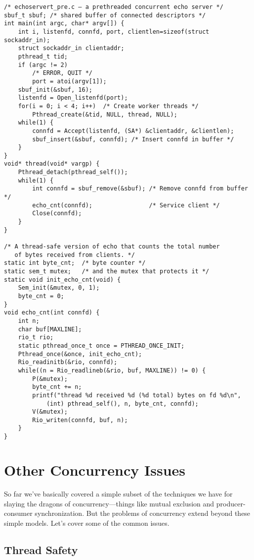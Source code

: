 \documentclass[fleqn]{article}
\begin{document}
\begin{verbatim}
/* echoservert_pre.c – a prethreaded concurrent echo server */
sbuf_t sbuf; /* shared buffer of connected descriptors */
int main(int argc, char* argv[]) {
    int i, listenfd, connfd, port, clientlen=sizeof(struct sockaddr_in);
    struct sockaddr_in clientaddr;
    pthread_t tid; 
    if (argc != 2) 
        /* ERROR, QUIT */
        port = atoi(argv[1]);
    sbuf_init(&sbuf, 16);
    listenfd = Open_listenfd(port);
    for(i = 0; i < 4; i++)  /* Create worker threads */
        Pthread_create(&tid, NULL, thread, NULL);
    while(1) { 
        connfd = Accept(listenfd, (SA*) &clientaddr, &clientlen);
        sbuf_insert(&sbuf, connfd); /* Insert connfd in buffer */
    }
}
void* thread(void* vargp) {  
    Pthread_detach(pthread_self()); 
    while(1) { 
        int connfd = sbuf_remove(&sbuf); /* Remove connfd from buffer */
        echo_cnt(connfd);                /* Service client */
        Close(connfd);
    }
}

/* A thread-safe version of echo that counts the total number
   of bytes received from clients. */
static int byte_cnt;  /* byte counter */
static sem_t mutex;   /* and the mutex that protects it */
static void init_echo_cnt(void) {
    Sem_init(&mutex, 0, 1);
    byte_cnt = 0;
}
void echo_cnt(int connfd) {
    int n; 
    char buf[MAXLINE]; 
    rio_t rio;
    static pthread_once_t once = PTHREAD_ONCE_INIT;
    Pthread_once(&once, init_echo_cnt);
    Rio_readinitb(&rio, connfd);
    while((n = Rio_readlineb(&rio, buf, MAXLINE)) != 0) {
        P(&mutex);
        byte_cnt += n;
        printf("thread %d received %d (%d total) bytes on fd %d\n", 
            (int) pthread_self(), n, byte_cnt, connfd);
        V(&mutex);
        Rio_writen(connfd, buf, n);
    }
}
\end{verbatim}

\section{Other Concurrency Issues}

So far we've basically covered a simple subset of the techniques we have for slaying the dragons of concurrency---things like mutual exclusion and producer-consumer synchronization. But the problems of concurrency extend beyond these simple models. Let's cover some of the common issues.

\subsection{Thread Safety}
\end{document}
